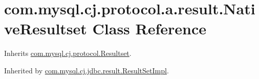 \hypertarget{classcom_1_1mysql_1_1cj_1_1protocol_1_1a_1_1result_1_1_native_resultset}{}\section{com.\+mysql.\+cj.\+protocol.\+a.\+result.\+Native\+Resultset Class Reference}
\label{classcom_1_1mysql_1_1cj_1_1protocol_1_1a_1_1result_1_1_native_resultset}


Inherits \mbox{\hyperlink{interfacecom_1_1mysql_1_1cj_1_1protocol_1_1_resultset}{com.\+mysql.\+cj.\+protocol.\+Resultset}}.



Inherited by \mbox{\hyperlink{classcom_1_1mysql_1_1cj_1_1jdbc_1_1result_1_1_result_set_impl}{com.\+mysql.\+cj.\+jdbc.\+result.\+Result\+Set\+Impl}}.

